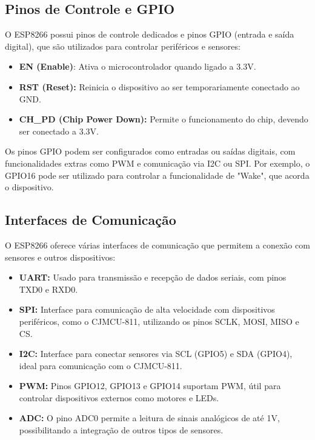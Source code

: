 \subsection{Pinos de Controle e GPIO}

O ESP8266 possui pinos de controle dedicados e pinos GPIO (entrada e saída digital), que são utilizados para controlar periféricos e sensores:

\begin{itemize}
    \item \textbf{EN (Enable)}: Ativa o microcontrolador quando ligado a 3.3V.
    \item \textbf{RST (Reset):} Reinicia o dispositivo ao ser temporariamente conectado ao GND.
    \item \textbf{CH\_PD (Chip Power Down):} Permite o funcionamento do chip, devendo ser conectado a 3.3V.
\end{itemize}

Os pinos GPIO podem ser configurados como entradas ou saídas digitais, com funcionalidades extras como PWM e comunicação via I2C ou SPI. Por exemplo, o GPIO16 pode ser utilizado para controlar a funcionalidade de "Wake", que acorda o dispositivo.

\subsection{Interfaces de Comunicação}

O ESP8266 oferece várias interfaces de comunicação que permitem a conexão com sensores e outros dispositivos:

\begin{itemize} 
    \item \textbf{UART:} Usado para transmissão e recepção de dados seriais, com pinos TXD0 e RXD0. 
    \item \textbf{SPI:} Interface para comunicação de alta velocidade com dispositivos periféricos, como o CJMCU-811, utilizando os pinos SCLK, MOSI, MISO e CS.
    \item \textbf{I2C:} Interface para conectar sensores via SCL (GPIO5) e SDA (GPIO4), ideal para comunicação com o CJMCU-811. 
    \item \textbf{PWM:} Pinos GPIO12, GPIO13 e GPIO14 suportam PWM, útil para controlar dispositivos externos como motores e LEDs. 
    \item \textbf{ADC:} O pino ADC0 permite a leitura de sinais analógicos de até 1V, possibilitando a integração de outros tipos de sensores. 
\end{itemize}

